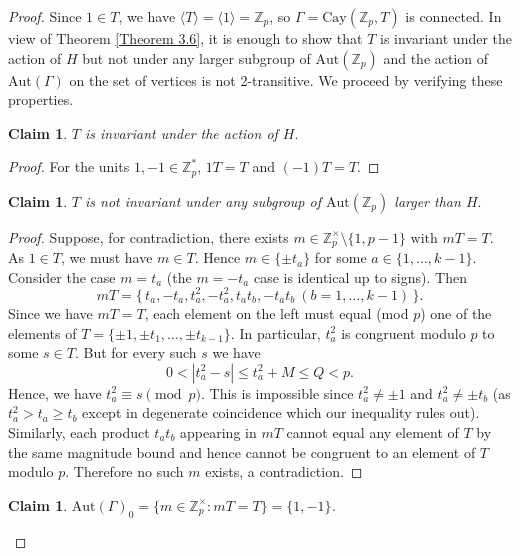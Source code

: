 \documentclass[12pt,reqno,a4paper]{amsart}
\theoremstyle{definition}
\newtheorem{claim}[defn]{Claim}
\begin{document}
\begin{proof}
Since $1\in T$, we have $\langle T\rangle=\langle 1\rangle=\mathbb Z_p$, so $\Gamma=\mathrm{Cay}(\mathbb Z_p,T)$ is connected.
In view of Theorem \ref{Theorem 3.6}, it is enough to show that $T$ is invariant under the action of $H$ but not under any larger subgroup of $\mathrm{Aut}(\mathbb{Z}_p)$ and 
the action of $\mathrm{Aut}(\Gamma)$ on the set of vertices is not 2-transitive. We proceed by verifying these properties.


\begin{claim}\label{Claim 3.8}
{\em $T$ is invariant under the action of $H$}.
\end{claim}

\begin{proof}
For the units $1,-1\in \mathbb{Z}_{p}^{*}$, $1T=T$ and $(-1)T=T$.
 \end{proof}

\begin{claim}\label{Claim 3.9}
{\em $T$ is not invariant under any subgroup of $\mathrm{Aut}(\mathbb{Z}_p)$ larger than $H$}.
\end{claim}

\begin{proof}
Suppose, for contradiction, there exists
$m\in\mathbb{Z}_p^\times\setminus\{1,p-1\}\text{ with } mT=T$.
As $1\in T$, we must have $m\in T$. Hence $m\in\{\pm t_a\}$ for some $a\in\{1,\dots,k-1\}$.
Consider the case $m=t_a$ (the $m=-t_a$ case is identical up to signs). Then
\[
mT=\{\,t_a,-t_a,t_a^2,-t_a^2,t_a t_b,-t_a t_b\ (b=1,\dots,k-1)\,\}.
\]
Since we have $mT=T$, each element on the left must equal (mod $p$) one of the elements of $T=\{\pm1,\pm t_1,\dots,\pm t_{k-1}\}$.
In particular, $t_a^2$ is congruent modulo $p$ to some $s\in T$.
But for every such $s$ we have 
\[
0<|t_a^2-s|\le t_a^2 + M \le Q < p.
\]
Hence, we have $t_a^2\equiv s \pmod p$.  This is impossible since $t_a^2\neq\pm1$ and  $t_a^2\neq \pm t_b$ (as $t_a^2>t_a\ge t_b$ except in degenerate coincidence which our inequality rules out).  
Similarly, each product $t_a t_b$ appearing in $mT$ cannot equal any element of $T$ by the same magnitude bound and hence cannot be congruent to an element of $T$ modulo $p$.
Therefore no such $m$ exists, a contradiction.
 \end{proof}

\begin{claim}\label{Claim 3.10}
{\em $\mathrm{Aut}(\Gamma)_{0}=\{m \in \mathbb{Z}_p^{\times} : mT = T\}=\{1,-1\}$.}
\end{claim}


\end{proof}
\end{document}

